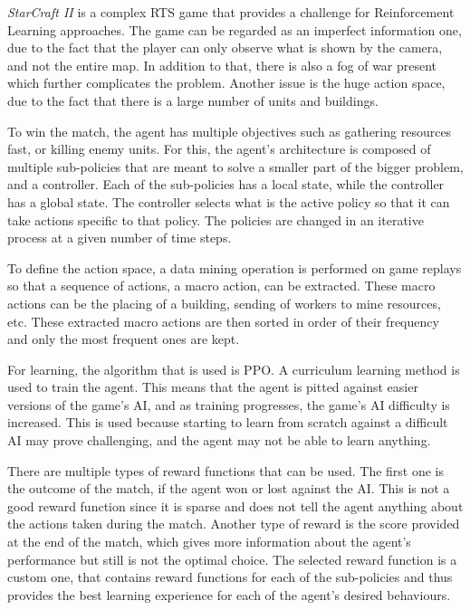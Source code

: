 \emph{StarCraft II} is a complex RTS game that provides a challenge for Reinforcement Learning approaches. The game can be regarded as an imperfect information one, due to the fact that the player can only observe what is shown by the camera, and not the entire map. In addition to that, there is also a fog of war present which further complicates the problem. Another issue is the huge action space, due to the fact that there is a large number of units and buildings.

To win the match, the agent has multiple objectives such as gathering resources fast, or killing enemy units. For this, the agent's architecture is composed of multiple sub-policies that are meant to solve a smaller part of the bigger problem, and a controller. Each of the sub-policies has a local state, while the controller has a global state. The controller selects what is the active policy so that it can take actions specific to that policy. The policies are changed in an iterative process at a given number of time steps.

To define the action space, a data mining operation is performed on game replays so that a sequence of actions, a macro action, can be extracted. These macro actions can be the placing of a building, sending of workers to mine resources, etc. These extracted macro actions are then sorted in order of their frequency and only the most frequent ones are kept.

For learning, the algorithm that is used is PPO. A curriculum learning method is used to train the agent. This means that the agent is pitted against easier versions of the game's AI, and as training progresses, the game's AI difficulty is increased. This is used because starting to learn from scratch against a difficult AI may prove challenging, and the agent may not be able to learn anything.

There are multiple types of reward functions that can be used. The first one is the outcome of the match, if the agent won or lost against the AI. This is not a good reward function since it is sparse and does not tell the agent anything about the actions taken during the match. Another type of reward is the score provided at the end of the match, which gives more information about the agent's performance but still is not the optimal choice. The selected reward function is a custom one, that contains reward functions for each of the sub-policies and thus provides the best learning experience for each of the agent's desired behaviours.

